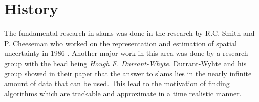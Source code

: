 \section{History}
The fundamental research in \gls{slam}s was done in the research by R.C. Smith and P. Cheeseman who worked on the representation and estimation of spatial uncertainty in 1986 \cite{slamfordummies}. Another major work in this area was done by a research group with the head being \textit{Hough F. Durrant-Whyte}. Durrant-Wyhte and his group showed in their paper \cite{1678144} that the answer to \gls{slam}s lies in the nearly infinite amount of data that can be used. This lead to the motivation of finding algorithms which are trackable and approximate in a time realistic manner.\newline


